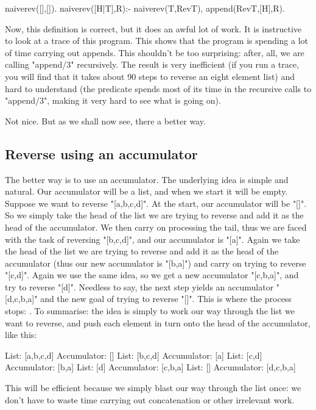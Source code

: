 \begin{LPNcodedisplay}
naiverev([],[]).
naiverev([H|T],R):- naiverev(T,RevT), append(RevT,[H],R).
\end{LPNcodedisplay}

Now, this definition is correct, but it does an awful lot of work.
It is  instructive to look at a trace of this program.  This
shows that the program is spending a lot of time carrying out appends.
This shouldn't be too surprising: after, all, we are calling
"append/3" recursively.  The result is very
inefficient (if you run a trace, you will find that it takes about 90
steps to reverse an eight element list) and hard to understand (the
predicate spends most of its time in the recursive calls to
"append/3", making it very hard to see what is going on).

Not nice. But as we shall now see, there  a better way.



\subsection*{Reverse using an accumulator}\label{SUBSEC.L6.REVERSE.ACC}

The better way is to use an accumulator.  The underlying idea is
simple and natural.  Our accumulator will be a list, and when we start
it will be empty.  Suppose we want to reverse "[a,b,c,d]".  At
the start, our accumulator will be "[]".  So we simply take the
head of the list we are trying to reverse and add it as the head of
the accumulator.  We then carry on processing the tail, thus we are
faced with the task of reversing "[b,c,d]", and our accumulator
is "[a]".  Again we take the head of the list we are trying to
reverse and add it as the head of the accumulator (thus our new
accumulator is "[b,a]") and carry on trying to reverse "[c,d]".
Again we use the same idea, so we get a new accumulator
"[c,b,a]", and try to reverse "[d]".  Needless to say, the
next step yields an accumulator "[d,c,b,a]" and the new goal of
trying to reverse "[]".  This is where the process stops: .  To summarise:
the idea is simply to work our way through the list we want to
reverse, and push each element in turn onto the head of the
accumulator, like this:
\begin{LPNcodedisplay}
List: [a,b,c,d]  Accumulator: []
List: [b,c,d]    Accumulator: [a]
List: [c,d]      Accumulator: [b,a]
List: [d]        Accumulator: [c,b,a]
List: []         Accumulator: [d,c,b,a]
\end{LPNcodedisplay}
This will be efficient because we simply blast our way through the list once:
we don't have to waste time carrying out concatenation or other
irrelevant work.


